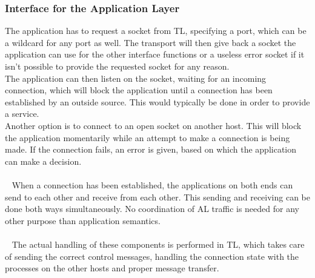 \subsubsection{Interface for the Application Layer}
The application has to request a socket from TL, specifying a port, which can be a wildcard for any port as well. The transport will then give back a socket the application can use for the other interface functions or a useless error socket if it isn't possible to provide the requested socket for any reason.\\
The application can then listen on the socket, waiting for an incoming connection, which will block the application until a connection has been established by an outside source. This would typically be done in order to provide a service.\\
Another option is to connect to an open socket on another host. This will block the application momentarily while an attempt to make a connection is being made. If the connection fails, an error is given, based on which the application can make a decision.\\
\\~
When a connection has been established, the applications on both ends can send to each other and receive from each other. This sending and receiving can be done both ways simultaneously. No coordination of AL traffic is needed for any other purpose than application semantics.\\
\\~
The actual handling of these components is performed in TL, which takes care of sending the correct control messages, handling the connection state with the processes on the other hosts and proper message transfer.
